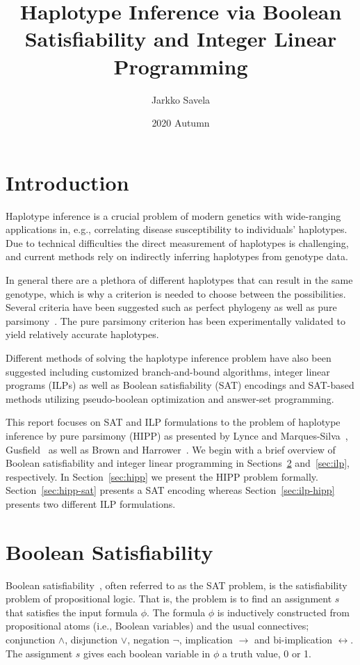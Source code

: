 \documentclass[12pt,a4paper]{article}
\title{Haplotype Inference via Boolean Satisfiability and Integer Linear Programming}
\date{2020 Autumn}
\author{Jarkko Savela}
\begin{document}
\maketitle
\newpage
\tableofcontents
\newpage
{}

\section{Introduction}
Haplotype inference is a crucial problem of modern genetics with wide-ranging applications in, e.g., correlating disease susceptibility to individuals' haplotypes.
Due to technical difficulties the direct measurement of haplotypes is challenging, and current methods rely on indirectly inferring haplotypes from genotype data.

In general there are a plethora of different haplotypes that can result in the same genotype, 
which is why a criterion is needed to choose between the possibilities.
Several criteria have been suggested such as perfect phylogeny as well as pure parsimony~\cite{gusfield2019integer}.
The pure parsimony criterion has been experimentally validated to yield relatively accurate haplotypes.

Different methods of solving the haplotype inference problem have also been suggested including customized branch-and-bound algorithms, integer linear programs (ILPs) as well as Boolean satisfiability (SAT) encodings and SAT-based methods utilizing pseudo-boolean optimization and answer-set programming.

This report focuses on SAT and ILP formulations to the problem of haplotype inference by pure parsimony (HIPP) as presented by Lynce and Marques-Silva~\cite{DBLP:conf/aaai/LynceM06}, Gusfield~\cite{DBLP:conf/cpm/Gusfield03} as well as Brown and Harrower~\cite{DBLP:journals/tcbb/BrownH06}.
We begin with a brief overview of Boolean satisfiability and integer linear programming in Sections~\ref{sec:sat} and~\ref{sec:ilp}, respectively.
In Section~\ref{sec:hipp} we present the HIPP problem formally.
Section~\ref{sec:hipp-sat} presents a SAT encoding whereas 
Section~\ref{sec:ilp-hipp} presents two different ILP formulations. 



\section{Boolean Satisfiability}
\label{sec:sat}
Boolean satisfiability~\cite{DBLP:series/faia/2009-185}, often referred to as the SAT problem, is the satisfiability problem of propositional logic.
That is, the problem is to find an assignment $s$ that satisfies the input formula $\phi$.
The formula $\phi$ is inductively constructed from propositional atoms (i.e., Boolean variables) and the usual connectives; conjunction $\wedge$, disjunction $\vee$, negation $\neg$, implication $\rightarrow$ and bi-implication $\leftrightarrow$.
The assignment $s$ gives each boolean variable in $\phi$ a truth value, 0 or 1.
\end{document}

